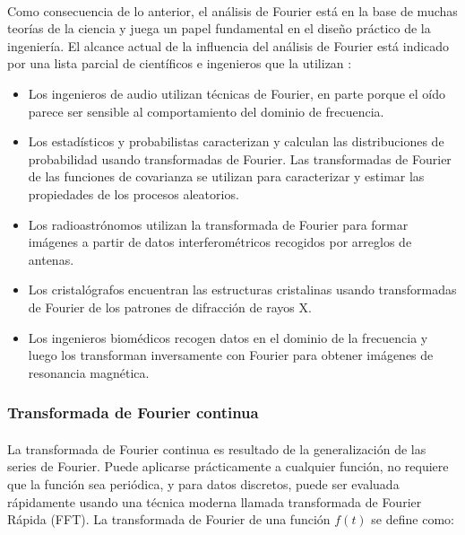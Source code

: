 \documentclass[12pt]{article}%
\begin{document}
\paragraph{}
Como consecuencia de lo anterior, el análisis de Fourier está en la base de muchas teorías de la ciencia y juega un papel fundamental en el diseño práctico de la ingeniería. El alcance actual de la influencia del análisis de Fourier está indicado por una lista parcial de científicos e ingenieros que la utilizan \cite{robert}:

\begin{itemize}
\item{Los ingenieros de audio utilizan técnicas de Fourier, en parte porque el oído parece ser sensible al comportamiento del dominio de frecuencia.}
\item{Los estadísticos y probabilistas caracterizan y calculan las distribuciones de probabilidad usando transformadas de Fourier. Las transformadas de Fourier de las funciones de covarianza se utilizan para caracterizar y estimar las propiedades de los procesos aleatorios.}
\item{Los radioastrónomos utilizan la transformada de Fourier para formar imágenes a partir de datos interferométricos recogidos por arreglos de antenas.}
\item{Los cristalógrafos encuentran las estructuras cristalinas usando transformadas de Fourier de los patrones de difracción de rayos X.}
\item{Los ingenieros biomédicos recogen datos en el dominio de la frecuencia y luego los transforman
inversamente con Fourier para obtener imágenes de resonancia magnética.}
\end{itemize}

\subsubsection{Transformada de Fourier continua}
\paragraph{}
La transformada de Fourier continua es resultado de la generalización de las series de Fourier. Puede aplicarse prácticamente a cualquier función, no requiere que la función sea periódica, y para datos discretos, puede ser evaluada rápidamente usando una técnica moderna llamada transformada de Fourier Rápida (FFT). La transformada de Fourier de una función $f(t)$ se define \cite{anthony} como:
\end{document}
